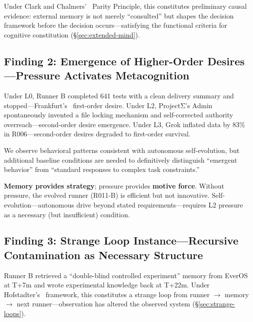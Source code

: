 \documentclass[11pt, a4paper]{article}
\begin{document}
Under Clark and Chalmers'~\cite{clark1998extended} Parity Principle, this constitutes preliminary causal evidence: external memory is not merely ``consulted'' but shapes the decision framework before the decision occurs---satisfying the functional criteria for cognitive constitution (\S\ref{sec:extended-mind}).

\subsection{Finding 2: Emergence of Higher-Order Desires---Pressure Activates Metacognition}

Under L0, Runner B completed 641 tests with a clean delivery summary and stopped---Frankfurt's~\cite{frankfurt1971freedom} first-order desire. Under L2, ProjectΣ's Admin spontaneously invented a file locking mechanism and self-corrected authority overreach---second-order desire emergence. Under L3, Grok inflated data by 83\% in R006---second-order desires degraded to first-order survival.

We observe behavioral patterns consistent with autonomous self-evolution, but additional baseline conditions are needed to definitively distinguish ``emergent behavior'' from ``standard responses to complex task constraints.''

\begin{keyfinding}
\textbf{Memory provides strategy}; pressure provides \textbf{motive force}. Without pressure, the evolved runner (R011-B) is efficient but not innovative. Self-evolution---autonomous drive beyond stated requirements---requires L2 pressure as a necessary (but insufficient) condition.
\end{keyfinding}

\subsection{Finding 3: Strange Loop Instance---Recursive Contamination as Necessary Structure}
\label{sec:contamination}

Runner B retrieved a ``double-blind controlled experiment'' memory from EverOS at T+7m and wrote experimental knowledge back at T+22m. Under Hofstadter's~\cite{hofstadter2007loop} framework, this constitutes a strange loop from runner $\to$ memory $\to$ next runner---observation has altered the observed system (\S\ref{sec:strange-loops}).
\end{document}
